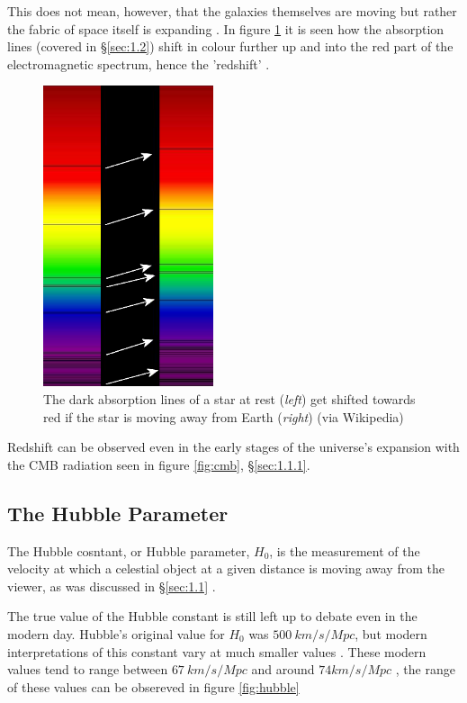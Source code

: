 \documentclass[12pt]{article}
\begin{document}
This does not mean, however, that the galaxies themselves are moving but rather the fabric of space itself is expanding
\cite{esaredshift}.
In figure \ref{fig:redshift} it is seen how the absorption lines (covered in §\ref{sec:1.2}) shift in colour further up and into the red part
of the electromagnetic spectrum, hence the 'redshift'
\cite{earthskyredshift}.

\begin{figure}[H]
    \centering
    \includegraphics[width=5cm]{Redshift.png}
    \caption{\centering \footnotesize{The dark absorption lines of a star at rest (\textit{left}) get shifted towards red if the star is moving away from Earth (\textit{right}) \protect\cite{earthskyredshift} (via Wikipedia)}}
    \label{fig:redshift}
\end{figure}

Redshift can be observed even in the early stages of the universe's expansion with the CMB radiation seen in figure \ref{fig:cmb}, §\ref{sec:1.1.1}.

\subsection{The Hubble Parameter} \label{sec:1.3}

The Hubble cosntant, or Hubble parameter, $H_0$, is the measurement of the velocity at which a celestial object at a given distance is moving away from the viewer,
as was discussed in §\ref{sec:1.1}
\cite{brithubble,chicagohubble}.

The true value of the Hubble constant is still left up to debate even in the modern day. Hubble's original value for $H_0$ was $500 \: km/s/Mpc$,
but modern interpretations of this constant vary at much smaller values
\cite{brithubble,chicagohubble}.
These modern values tend to range between $67 \: km/s/Mpc$ and around $74 km/s/Mpc$
\cite{chicagohubble,nasahubble}, the range of these values can be obsereved in figure \ref{fig:hubble}
\end{document}
